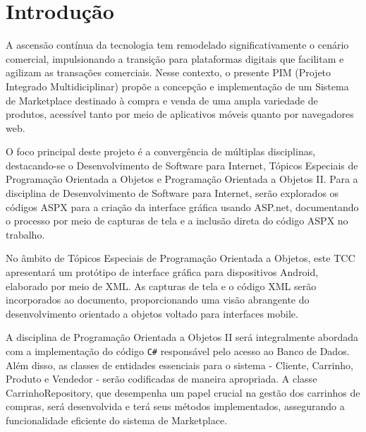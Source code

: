 \documentclass[
	12pt,				%
	openright,			%
	twoside,			%
	a4paper,			%
	english,			%
	brazil				%
	]{abntex2}
\begin{document}
\textual

\chapter{Introdução}

A ascensão contínua da tecnologia tem remodelado significativamente o cenário comercial, impulsionando a transição para plataformas digitais que facilitam e agilizam as transações comerciais. Nesse contexto, o presente PIM (Projeto Integrado Multidiciplinar) propõe a concepção e implementação de um Sistema de Marketplace destinado à compra e venda de uma ampla variedade de produtos, acessível tanto por meio de aplicativos móveis quanto por navegadores web.

O foco principal deste projeto é a convergência de múltiplas disciplinas, destacando-se o Desenvolvimento de Software para Internet, Tópicos Especiais de Programação Orientada a Objetos e Programação Orientada a Objetos II. Para a disciplina de Desenvolvimento de Software para Internet, serão explorados os códigos ASPX para a criação da interface gráfica usando ASP.net, documentando o processo por meio de capturas de tela e a inclusão direta do código ASPX no trabalho.

No âmbito de Tópicos Especiais de Programação Orientada a Objetos, este TCC apresentará um protótipo de interface gráfica para dispositivos Android, elaborado por meio de XML. As capturas de tela e o código XML serão incorporados ao documento, proporcionando uma visão abrangente do desenvolvimento orientado a objetos voltado para interfaces mobile.

A disciplina de Programação Orientada a Objetos II será integralmente abordada com a implementação do código \texttt{C\#} responsável pelo acesso ao Banco de Dados. Além disso, as classes de entidades essenciais para o sistema - Cliente, Carrinho, Produto e Vendedor - serão codificadas de maneira apropriada. A classe CarrinhoRepository, que desempenha um papel crucial na gestão dos carrinhos de compras, será desenvolvida e terá seus métodos implementados, assegurando a funcionalidade eficiente do sistema de Marketplace.
\end{document}

